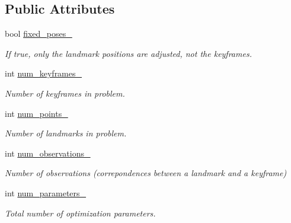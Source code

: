 \subsection*{Public Attributes}
\begin{DoxyCompactItemize}
\item 
\mbox{\label{classBALProblem_addfe81faa0a3a9406c6998bbf63b5161}} 
bool \hyperlink{classBALProblem_addfe81faa0a3a9406c6998bbf63b5161}{fixed\+\_\+poses\+\_\+}
\begin{DoxyCompactList}\small\item\em If true, only the landmark positions are adjusted, not the keyframes. \end{DoxyCompactList}\item 
\mbox{\label{classBALProblem_ad3caa42180a04d6cadc77c6469e8c05f}} 
int \hyperlink{classBALProblem_ad3caa42180a04d6cadc77c6469e8c05f}{num\+\_\+keyframes\+\_\+}
\begin{DoxyCompactList}\small\item\em Number of keyframes in problem. \end{DoxyCompactList}\item 
\mbox{\label{classBALProblem_a150ce94d21ed28813ee952592ad2cc79}} 
int \hyperlink{classBALProblem_a150ce94d21ed28813ee952592ad2cc79}{num\+\_\+points\+\_\+}
\begin{DoxyCompactList}\small\item\em Number of landmarks in problem. \end{DoxyCompactList}\item 
\mbox{\label{classBALProblem_a56442746026abb390c4793dfcceeb60b}} 
int \hyperlink{classBALProblem_a56442746026abb390c4793dfcceeb60b}{num\+\_\+observations\+\_\+}
\begin{DoxyCompactList}\small\item\em Number of observations (correpondences between a landmark and a keyframe) \end{DoxyCompactList}\item 
\mbox{\label{classBALProblem_a6e73e7f1014a05baab7d268e0902ae02}} 
int \hyperlink{classBALProblem_a6e73e7f1014a05baab7d268e0902ae02}{num\+\_\+parameters\+\_\+}
\begin{DoxyCompactList}\small\item\em Total number of optimization parameters. \end{DoxyCompactList}\item 

\end{DoxyCompactItemize}

